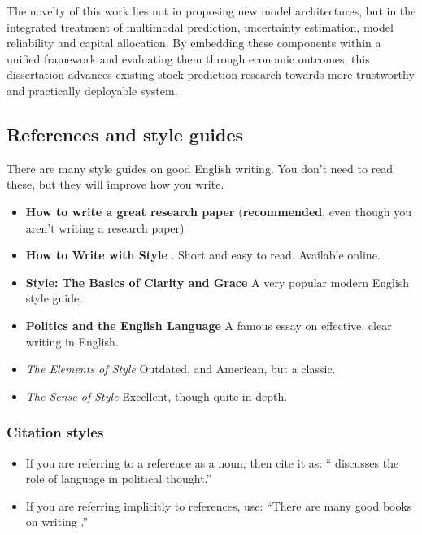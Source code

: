 \documentclass{l4proj}
\begin{document}
The novelty of this work lies not in proposing new model architectures, but in the integrated treatment of multimodal prediction, uncertainty estimation, model reliability and capital allocation. By embedding these components within a unified framework and evaluating them through economic outcomes, this dissertation advances existing stock prediction research towards more trustworthy and practically deployable system.

\subsection{References and style guides}
There are many style guides on good English writing. You don't need to
read these, but they will improve how you write.

\begin{itemize}
    \item
    \textbf{How to write a great research paper} \cite{Pey17} (\textbf{recommended}, even though you aren't writing a research paper)
    \item
    \textbf{How to Write with Style} \cite{Von80}. Short and easy to read. Available online.
    \item
    \textbf{Style: The Basics of Clarity and Grace} \cite{Wil09} A very popular modern English style guide.
    \item
    \textbf{Politics and the English Language} \cite{Orw68}  A famous essay on effective, clear writing in English.
    \item
    \emph{The Elements of Style} \cite{StrWhi07} Outdated, and American, but a classic.
    \item
    \emph{The Sense of Style} \cite{Pin15} Excellent, though quite in-depth.
\end{itemize}

\subsubsection{Citation styles}

\begin{itemize}
\item If you are referring to a reference as a noun, then cite it as: ``\citet{Orw68} discusses the role of language in political thought.''
\item If you are referring implicitly to references, use: ``There are many good books on writing \citep{Orw68, Wil09, Pin15}.''
\end{itemize}
\end{document}
